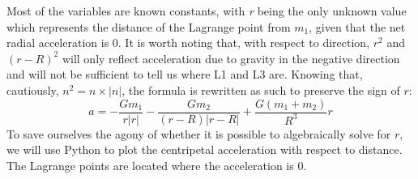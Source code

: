 Most of the variables are known constants, with \textit{r} being the only unknown value which represents the distance of the Lagrange point from $m_1$, given that the net radial acceleration is 0.
It is worth noting that, with respect to direction, $r^2$ and $(r-R)^2$ will only reflect acceleration due to gravity in the negative direction and will not be sufficient to tell us where L1 and L3 are.
Knowing that, cautiously, $n^2 = n \times |n|$, the formula is rewritten as such to preserve the sign of $r$:
\begin{equation}
	a = -\frac{Gm_1}{r|r|} - \frac{Gm_2}{(r - R)|r - R|} + \frac{G(m_1+m_2)}{R^3}r \label{eqn:x-accel1}
\end{equation}
To save ourselves the agony of whether it is possible to algebraically solve for $r$, we will use Python to plot the centripetal acceleration with respect to distance. The Lagrange points are located where the acceleration is 0.
